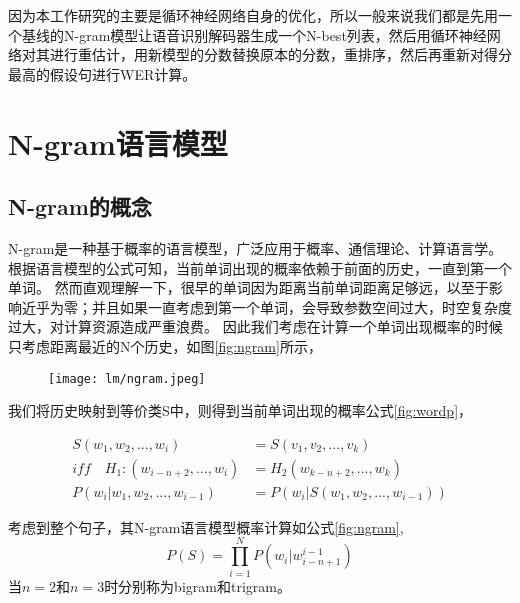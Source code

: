 因为本工作研究的主要是循环神经网络自身的优化，所以一般来说我们都是先用一个基线的N-gram模型让语音识别解码器生成一个N-best列表，然后用循环神经网络对其进行重估计，用新模型的分数替换原本的分数，重排序，然后再重新对得分最高的假设句进行WER计算。



\section{N-gram语言模型}

\subsection{N-gram的概念}
N-gram是一种基于概率的语言模型，广泛应用于概率、通信理论、计算语言学。
根据语言模型的公式可知，当前单词出现的概率依赖于前面的历史，一直到第一个单词。
然而直观理解一下，很早的单词因为距离当前单词距离足够远，以至于影响近乎为零；并且如果一直考虑到第一个单词，会导致参数空间过大，时空复杂度过大，对计算资源造成严重浪费。
因此我们考虑在计算一个单词出现概率的时候
只考虑距离最近的N个历史，如图\ref{fig:ngram}所示，

\begin{figure}[!htbp]
  \centering
  \begin{minipage}[b]{0.6\textwidth}
    \captionstyle{\centering}
    \centering
    \texttt{[image: lm/ngram.jpeg]}
  \end{minipage}     
\end{figure}


我们将历史映射到等价类S中，则得到当前单词出现的概率公式\ref{fig:wordp}，

\begin{equation}
\begin{split}
	\label{eq:wordp}
   	S({w_1},{w_2},...,{w_i}) &= S({v_1},{v_2},...,{v_k}) \\
    iff  \quad H_1:(w_{i-n+2},...,{w_i}) &= H_2(w_{k-n+2},...,{w_k}) \\
	P({w_i}|{w_1},{w_2},...,{w_{i - 1}}) &= P({w_i}|S({w_1},{w_2},...,{w_{i - 1}}))
\end{split}
\end{equation}

考虑到整个句子，其N-gram语言模型概率计算如公式\ref{fig:ngram},
\begin{equation}
	\label{eq:ngram}
   	P(S) = \prod\limits_{i = 1}^N {P( {{w_i}|w_{i - n + 1}^{i - 1}} )}
\end{equation}
当$n=2$和$n=3$时分别称为bigram和trigram。


